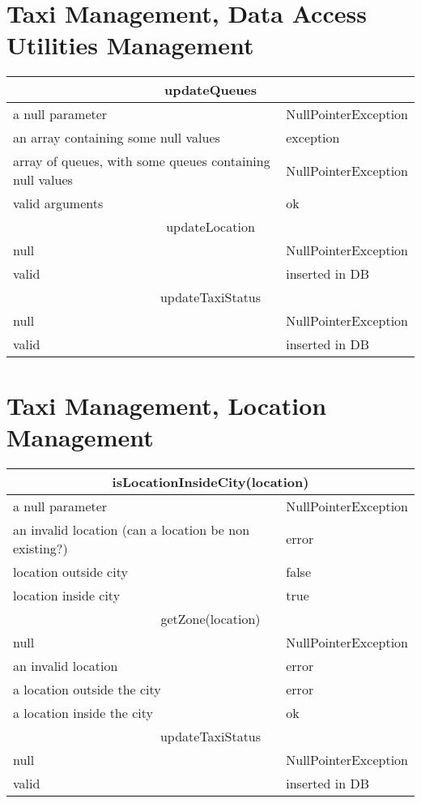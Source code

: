 \documentclass[11pt,oneside,a4paper]{report}
\begin{document}
\section{Taxi Management, Data Access Utilities Management}
\begin{tabular}{p{5cm}|p{6cm}}
	\hline
	\multicolumn{2}{c}{updateQueues}\\\hline
	a null parameter &
	NullPointerException \\\hline
	an array containing some null values &
	exception\\\hline
	array of queues, with some queues containing null values &
	NullPointerException \\\hline
	valid arguments &
	ok \\\hline\hline
	
	\multicolumn{2}{c}{updateLocation}\\\hline
	null &
	NullPointerException \\\hline
	valid &
	inserted in DB \\\hline\hline
	
	\multicolumn{2}{c}{updateTaxiStatus}\\\hline
	null &
	NullPointerException \\\hline
	valid &
	inserted in DB \\\hline
\end{tabular}


\section{Taxi Management, Location Management}
\begin{table}[ph]
\centering
\begin{tabular}{p{5cm}|p{6cm}}
	\hline
	\multicolumn{2}{c}{isLocationInsideCity(location)}\\\hline
	a null parameter &
	NullPointerException \\\hline
	an invalid location (can a location be non existing?)&
	error \\\hline
	location outside city &
	false \\\hline
	location inside city &
	true \\\hline\hline
		
	\multicolumn{2}{c}{getZone(location)}\\\hline
	null &
	NullPointerException \\\hline
	an invalid location &
	error \\\hline
	a location outside the city &
	error \\\hline
	a location inside the city &
	ok \\\hline\hline
	
	\multicolumn{2}{c}{updateTaxiStatus}\\\hline
	null &
	NullPointerException \\\hline
	valid &
	inserted in DB \\\hline
\end{tabular}
\end{table}
\end{document}
